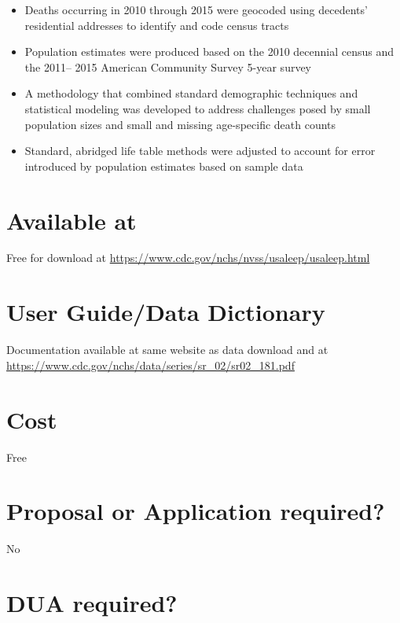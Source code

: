 \documentclass[
]{book}
\providecommand{\tightlist}{%
  \setlength{\itemsep}{0pt}\setlength{\parskip}{0pt}}
\begin{document}
\begin{itemize}
\tightlist
\item
  Deaths occurring in 2010 through 2015 were geocoded using decedents' residential addresses to identify and code census tracts
\item
  Population estimates were produced based on the 2010 decennial census and the 2011-- 2015 American Community Survey 5-year survey
\item
  A methodology that combined standard demographic techniques and statistical modeling was developed to address challenges posed by small population sizes and small and missing age-specific death counts
\item
  Standard, abridged life table methods were adjusted to account for error introduced by population estimates based on sample data
\end{itemize}

\hypertarget{available-at-96}{%
\section{Available at}\label{available-at-96}}

Free for download at \url{https://www.cdc.gov/nchs/nvss/usaleep/usaleep.html}

\hypertarget{user-guidedata-dictionary-96}{%
\section{User Guide/Data Dictionary}\label{user-guidedata-dictionary-96}}

Documentation available at same website as data download and at \url{https://www.cdc.gov/nchs/data/series/sr_02/sr02_181.pdf}

\hypertarget{cost-96}{%
\section{Cost}\label{cost-96}}

Free

\hypertarget{proposal-or-application-required-96}{%
\section{Proposal or Application required?}\label{proposal-or-application-required-96}}

No

\hypertarget{dua-required-96}{%
\section{DUA required?}\label{dua-required-96}}
\end{document}
